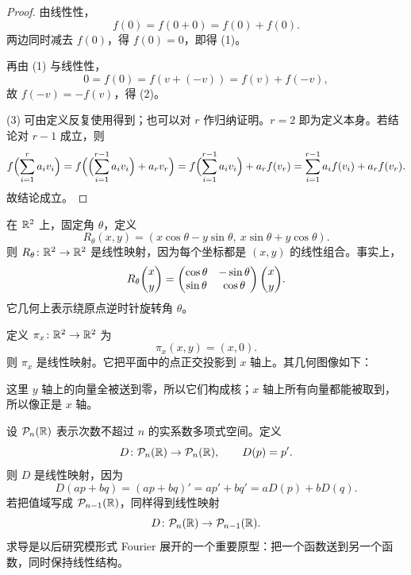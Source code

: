\begin{proof}
由线性性，
\[
  f(0)=f(0+0)=f(0)+f(0).
\]
两边同时减去 $f(0)$，得 $f(0)=0$，即得 (1)。

再由 (1) 与线性性，
\[
  0=f(0)=f(v+(-v))=f(v)+f(-v),
\]
故 $f(-v)=-f(v)$，得 (2)。

(3) 可由定义反复使用得到；也可以对 $r$ 作归纳证明。$r=2$ 即为定义本身。若结论对 $r-1$ 成立，则
\[
  f\Bigl(\sum_{i=1}^r a_i v_i\Bigr)
  =f\Bigl(\Bigl(\sum_{i=1}^{r-1} a_i v_i\Bigr)+a_r v_r\Bigr)
  =f\Bigl(\sum_{i=1}^{r-1} a_i v_i\Bigr)+a_r f(v_r)
  =\sum_{i=1}^{r-1} a_i f(v_i)+a_r f(v_r).
\]
故结论成立。
\end{proof}

\begin{example}[旋转]
在 $\mathbb{R}^2$ 上，固定角 $\theta$，定义
\[
  R_\theta(x,y)=(x\cos\theta-y\sin\theta,\ x\sin\theta+y\cos\theta).
\]
则 $R_\theta\colon \mathbb{R}^2\to\mathbb{R}^2$ 是线性映射，因为每个坐标都是 $(x,y)$ 的线性组合。事实上，
\[
  R_\theta\binom{x}{y}=
  \begin{pmatrix} \cos\theta & -\sin\theta\\ \sin\theta & \cos\theta \end{pmatrix}
  \binom{x}{y}.
\]
它几何上表示绕原点逆时针旋转角 $\theta$。
\end{example}

\begin{example}[投影]
定义 $\pi_x\colon \mathbb{R}^2\to\mathbb{R}^2$ 为
\[
  \pi_x(x,y)=(x,0).
\]
则 $\pi_x$ 是线性映射。它把平面中的点正交投影到 $x$ 轴上。其几何图像如下：
\begin{center}
\end{center}
这里 $y$ 轴上的向量全被送到零，所以它们构成核；$x$ 轴上所有向量都能被取到，所以像正是 $x$ 轴。
\end{example}

\begin{example}[多项式上的求导]
设 $\mathcal P_n(\mathbb{R})$ 表示次数不超过 $n$ 的实系数多项式空间。定义
\[
  D\colon \mathcal P_n(\mathbb{R})\to \mathcal P_n(\mathbb{R}),\qquad D(p)=p'.
\]
则 $D$ 是线性映射，因为
\[
  D(ap+bq)=(ap+bq)'=ap'+bq'=aD(p)+bD(q).
\]
若把值域写成 $\mathcal P_{n-1}(\mathbb{R})$，同样得到线性映射
\[
  D\colon \mathcal P_n(\mathbb{R})\to \mathcal P_{n-1}(\mathbb{R}).
\]
求导是以后研究模形式 Fourier 展开的一个重要原型：把一个函数送到另一个函数，同时保持线性结构。
\end{example}

